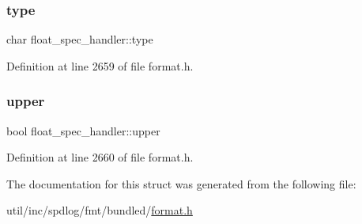 \subsubsection{\texorpdfstring{type}{type}}
{\footnotesize\ttfamily char float\+\_\+spec\+\_\+handler\+::type}



Definition at line 2659 of file format.\+h.

\mbox{\label{structfloat__spec__handler_ad4dce31d14a3d6b4bdd2c9bc2a1f1ecc}} 
\subsubsection{\texorpdfstring{upper}{upper}}
{\footnotesize\ttfamily bool float\+\_\+spec\+\_\+handler\+::upper}



Definition at line 2660 of file format.\+h.



The documentation for this struct was generated from the following file\+:\begin{DoxyCompactItemize}
\item 
util/inc/spdlog/fmt/bundled/\hyperlink{format_8h}{format.\+h}\end{DoxyCompactItemize}
